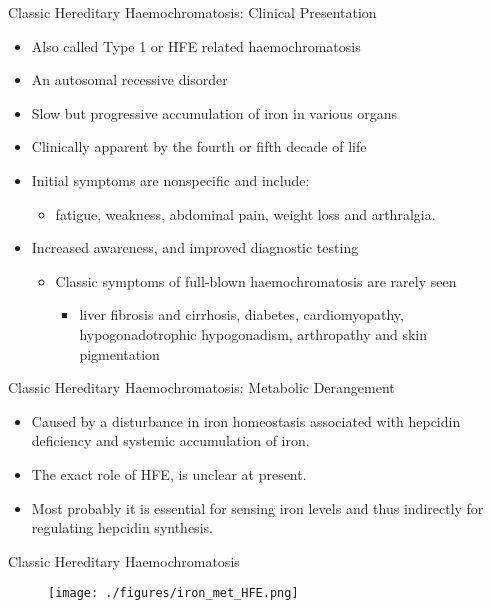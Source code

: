 \documentclass[presentation, smaller]{beamer}
\begin{document}
\begin{frame}[label={sec:orga2fb1c5}]{Classic Hereditary Haemochromatosis: Clinical Presentation}
\begin{itemize}
\item Also called Type 1 or HFE related haemochromatosis
\item An autosomal recessive disorder
\item Slow but progressive accumulation of iron in various organs
\item Clinically apparent by the fourth or fifth decade of life
\item Initial symptoms are nonspecific and include:
\begin{itemize}
\item fatigue, weakness, abdominal pain, weight loss and arthralgia.
\end{itemize}
\item Increased awareness, and improved diagnostic testing
\begin{itemize}
\item Classic symptoms of full-blown haemochromatosis are rarely seen
\begin{itemize}
\item liver fibrosis and cirrhosis, diabetes, cardiomyopathy,
hypogonadotrophic hypogonadism, arthropathy and skin
pigmentation
\end{itemize}
\end{itemize}
\end{itemize}
\end{frame}


\begin{frame}[label={sec:org15a3c4d}]{Classic Hereditary Haemochromatosis: Metabolic Derangement}
\begin{itemize}
\item Caused by a disturbance in iron homeostasis associated with hepcidin
deficiency and systemic accumulation of iron.
\item The exact role of HFE, is unclear at present.
\item Most probably it is essential for sensing iron levels and thus
indirectly for regulating hepcidin synthesis.
\end{itemize}
\end{frame}

\begin{frame}[label={sec:org1623de9}]{Classic Hereditary Haemochromatosis}
\begin{figure}[htbp]
\centering
\texttt{[image: ./figures/iron\_met\_HFE.png]}
\label{fig:org441e3f2}
\end{figure}
\end{frame}
\end{document}
